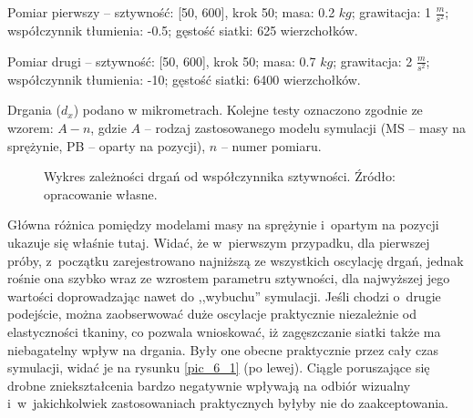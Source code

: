 		Pomiar pierwszy -- sztywność: [50, 600], krok 50; masa: 0.2 \(kg\); grawitacja: 1 \(\frac{m}{s^2}\); współczynnik tłumienia: -0.5; gęstość siatki: 625 wierzchołków.
		
		Pomiar drugi -- sztywność: [50, 600], krok 50; masa: 0.7 \(kg\); grawitacja: 2 \(\frac{m}{s^2}\); współczynnik tłumienia: -10; gęstość siatki: 6400 wierzchołków.
		
		Drgania (\(d_{x}\)) podano w mikrometrach. Kolejne testy oznaczono zgodnie ze wzorem: \(A-n\), gdzie \(A\) -- rodzaj zastosowanego modelu symulacji (MS -- masy na sprężynie, PB -- oparty na pozycji), \(n\) -- numer pomiaru.
		\newline
		
		
		\begin{figure}[H]
		\caption[Wykres zależności drgań od współczynnika sztywności.]{Wykres zależności drgań od współczynnika sztywności. Źródło: opracowanie własne.}
		\label{wykr_6_2}
		\end{figure}

		\newpage
		
		Główna różnica pomiędzy modelami masy na sprężynie i~opartym na pozycji ukazuje się właśnie tutaj. Widać, że w~pierwszym przypadku, dla pierwszej próby, z~początku zarejestrowano najniższą ze wszystkich oscylację drgań, jednak rośnie ona szybko wraz ze wzrostem parametru sztywności, dla najwyższej jego wartości doprowadzając nawet do ,,wybuchu'' symulacji. Jeśli chodzi o~drugie podejście, można zaobserwować duże oscylacje praktycznie niezależnie od elastyczności tkaniny, co pozwala wnioskować, iż zagęszczanie siatki także ma niebagatelny wpływ na drgania. Były one obecne praktycznie przez cały czas symulacji, widać je na rysunku \ref{pic_6_1} (po lewej). Ciągle poruszające się drobne zniekształcenia bardzo negatywnie wpływają na odbiór wizualny i~w~jakichkolwiek zastosowaniach praktycznych byłyby nie do zaakceptowania.
		
